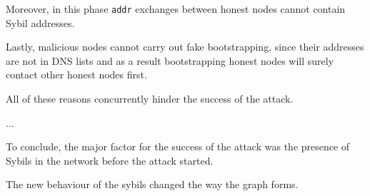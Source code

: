 Moreover, in this phase \texttt{addr} exchanges between honest nodes cannot contain Sybil addresses.

Lastly, malicious nodes cannot carry out fake bootstrapping, since their addresses are not in DNS lists and as a result bootstrapping honest nodes will surely contact other honest nodes first.

All of these reasons concurrently hinder the success of the attack.

...

To conclude, the major factor for the success of the attack was the presence of Sybils in the network before the attack started.

The new behaviour of the sybils changed the way the graph forms.